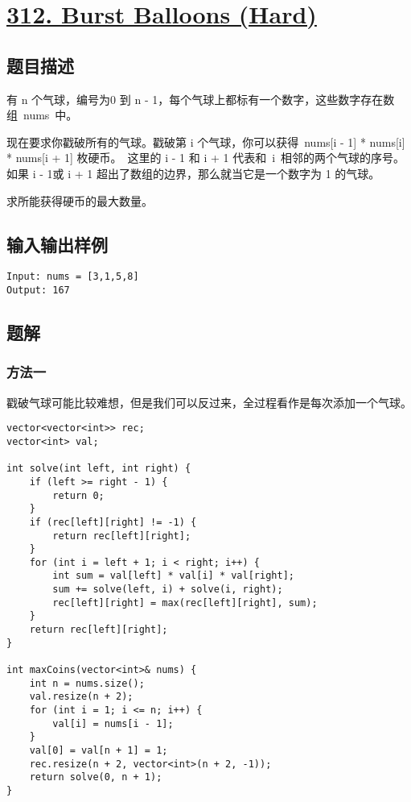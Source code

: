 \documentclass[lang=cn,10pt]{elegantbook}
\begin{document}
{\color{red}\section{\href{https://leetcode.cn/problems/burst-balloons/}{312. Burst Balloons (Hard)}}} \label{ch8.312}

\subsection*{题目描述}

有 n 个气球，编号为0 到 n - 1，每个气球上都标有一个数字，这些数字存在数组 nums 中。

现在要求你戳破所有的气球。戳破第 i 个气球，你可以获得 nums[i - 1] * nums[i] * nums[i + 1] 枚硬币。 这里的 i - 1 和 i + 1 代表和 i 相邻的两个气球的序号。如果 i - 1或 i + 1 超出了数组的边界，那么就当它是一个数字为 1 的气球。

求所能获得硬币的最大数量。

\subsection*{输入输出样例}

\begin{lstlisting}
Input: nums = [3,1,5,8]
Output: 167
\end{lstlisting}

\subsection*{题解}

\subsubsection*{方法一}

戳破气球可能比较难想，但是我们可以反过来，全过程看作是每次添加一个气球。

\begin{lstlisting}
vector<vector<int>> rec;
vector<int> val;

int solve(int left, int right) {
	if (left >= right - 1) {
		return 0;
	}
	if (rec[left][right] != -1) {
		return rec[left][right];
	}
	for (int i = left + 1; i < right; i++) {
		int sum = val[left] * val[i] * val[right];
		sum += solve(left, i) + solve(i, right);
		rec[left][right] = max(rec[left][right], sum);
	}
	return rec[left][right];
}

int maxCoins(vector<int>& nums) {
	int n = nums.size();
	val.resize(n + 2);
	for (int i = 1; i <= n; i++) {
		val[i] = nums[i - 1];
	}
	val[0] = val[n + 1] = 1;
	rec.resize(n + 2, vector<int>(n + 2, -1));
	return solve(0, n + 1);
}
\end{lstlisting}
\end{document}

